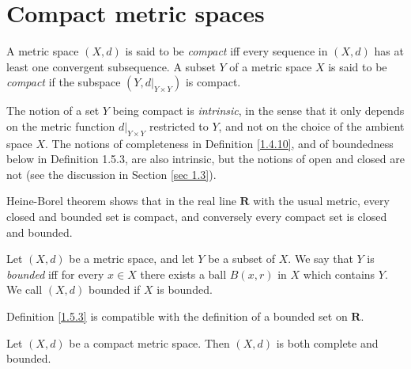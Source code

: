 \section{Compact metric spaces}\label{sec 1.5}

\begin{definition}[Compactness]\label{1.5.1}
    A metric space \((X, d)\) is said to be \emph{compact} iff every sequence in \((X, d)\) has at least one convergent subsequence.
    A subset \(Y\) of a metric space \(X\) is said to be \emph{compact} if the subspace \((Y, d|_{Y \times Y})\) is compact.
\end{definition}

\begin{remark}\label{1.5.2}
    The notion of a set \(Y\) being compact is \emph{intrinsic}, in the sense that it only depends on the metric function \(d|_{Y \times Y}\) restricted to \(Y\), and not on the choice of the ambient space \(X\).
    The notions of completeness in Definition \ref{1.4.10}, and of boundedness below in Definition 1.5.3, are also intrinsic, but the notions of open and closed are not
    (see the discussion in Section \ref{sec 1.3}).
\end{remark}

\begin{note}
    Heine-Borel theorem shows that in the real line \(\mathbf{R}\) with the usual metric, every closed and bounded set is compact, and conversely every compact set is closed and bounded.
\end{note}

\begin{definition}\label{1.5.3}
    Let \((X, d)\) be a metric space, and let \(Y\) be a subset of \(X\).
    We say that \(Y\) is \emph{bounded} iff for every \(x \in X\) there exists a ball \(B(x, r)\) in \(X\) which contains \(Y\).
    We call \((X, d)\) bounded if \(X\) is bounded.
\end{definition}

\begin{remark}\label{1.5.4}
    Definition \ref{1.5.3} is compatible with the definition of a bounded set on \(\mathbf{R}\).
\end{remark}

\begin{proposition}\label{1.5.5}
    Let \((X, d)\) be a compact metric space.
    Then \((X, d)\) is both complete and bounded.
\end{proposition}


